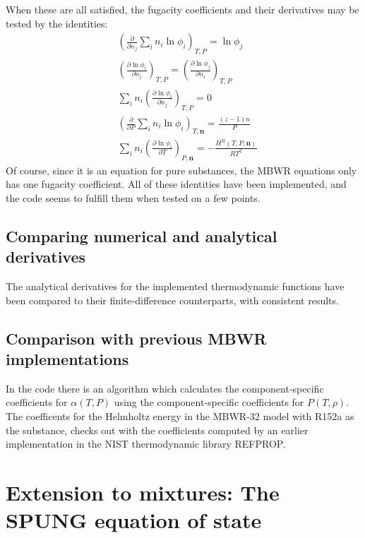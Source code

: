 \documentclass[english]{../thermomemo/thermomemo}
\newcommand*{\pder}[2]{\left(\frac{\partial #1}{\partial #2}\right)}
\numberwithin{equation}{section}
\begin{document}
When these are all satisfied, the fugacity coefficients and their
derivatives may be tested by the identities:
\begin{align}
  \label{test:4}
  & \left( \frac{\partial}{\partial n_j} \sum_i n_i \ln \phi_i \right)_{T,P} = \ln \phi_j \\
  \label{test:5}
  & \pder{\ln \phi_i}{n_j}_{T,P} = \pder{\ln \phi_j}{n_i}_{T,P} \\
  \label{test:6}
  & \sum_i n_i \pder{\ln \phi_i}{n_j}_{T,P} = 0 \\
  \label{test:7}
  & \left( \frac{\partial}{\partial P} \sum_i n_i \ln \phi_i \right)_{T,\textbf{n}} = \frac{(z-1) n}{P} \\
  \label{test:8}
  & \sum_i n_i \pder{ \ln \phi_i}{T}_{P,\textbf{n}} =
  -\frac{H^R(T,P,\textbf{n})}{RT^2}
\end{align}
Of course, since it is an equation for pure substances, the MBWR
equations only has one fugacity
coefficient. All of these identities have been implemented, and the
code seems to fulfill them when tested on a few points.

\subsection{Comparing numerical and analytical derivatives}
The analytical derivatives for the implemented thermodynamic functions
have been compared to their finite-difference counterparts, with
consistent results.

\subsection{Comparison with previous MBWR implementations}
In the code there is an algorithm which calculates the component-specific coefficients for $\alpha(T,P)$ using the component-specific coefficients for $P(T,\rho)$. The coefficents for the Helmholtz energy in the MBWR-32 model with R152a as the substance, checks out with the coefficients computed by an earlier implementation in the NIST thermodynamic library REFPROP.

\section{Extension to mixtures: The SPUNG equation of state}
\end{document}
